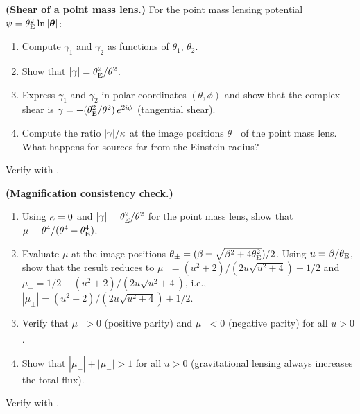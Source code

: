 \begin{exercise}
\label{ex:point_mass_shear}
\textbf{(Shear of a point mass lens.)}
For the point mass lensing potential
$\psi = \theta_{\mathrm{E}}^2\ln|\boldsymbol{\theta}|$:
\begin{enumerate}[label=(\alph*)]
    \item Compute $\gamma_1$ and $\gamma_2$ as functions of
          $\theta_1$, $\theta_2$.
    \item Show that $|\gamma| = \theta_{\mathrm{E}}^2/\theta^2$.
    \item Express $\gamma_1$ and $\gamma_2$ in polar coordinates
          $(\theta, \phi)$ and show that the complex shear is
          $\gamma = -(\theta_{\mathrm{E}}^2/\theta^2)\,e^{2i\phi}$
          (tangential shear).
    \item Compute the ratio $|\gamma|/\kappa$ at the image
          positions $\theta_\pm$ of the point mass lens.  What
          happens for sources far from the Einstein radius?
\end{enumerate}
Verify with
.
\end{exercise}

\begin{exercise}
\label{ex:magnification_consistency}
\textbf{(Magnification consistency check.)}
\begin{enumerate}[label=(\alph*)]
    \item Using $\kappa = 0$ and $|\gamma| = \theta_{\mathrm{E}}^2/\theta^2$
          for the point mass lens, show that
          $\mu = \theta^4/(\theta^4 - \theta_{\mathrm{E}}^4)$.
    \item Evaluate $\mu$ at the image positions $\theta_\pm =
          (\beta \pm \sqrt{\beta^2 + 4\theta_{\mathrm{E}}^2})/2$.  Using
          $u = \beta/\theta_{\mathrm{E}}$, show that the result reduces to
          $\mu_+ = (u^2+2)/(2u\sqrt{u^2+4}) + 1/2$ and
          $\mu_- = 1/2 - (u^2+2)/(2u\sqrt{u^2+4})$, i.e.,
          $|\mu_\pm| = (u^2+2)/(2u\sqrt{u^2+4}) \pm 1/2$.
    \item Verify that $\mu_+ > 0$ (positive parity) and
          $\mu_- < 0$ (negative parity) for all $u > 0$.
    \item Show that $|\mu_+| + |\mu_-| > 1$ for all $u > 0$
          (gravitational lensing always increases the total flux).
\end{enumerate}
Verify with
.
\end{exercise}

